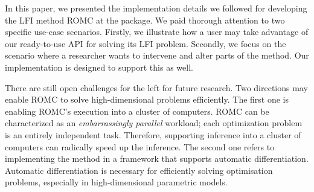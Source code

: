 In this paper, we presented the implementation details we followed for
developing the LFI method ROMC at the  package. We paid
thorough attention to two specific use-case scenarios. Firstly, we
illustrate how a user may take advantage of our ready-to-use API for
solving its LFI problem. Secondly, we focus on the scenario where a
researcher wants to intervene and alter parts of the method. Our
implementation is designed to support this as well.

There are still open challenges for the left for future research. Two
directions may enable ROMC to solve high-dimensional problems
efficiently. The first one is enabling ROMC's execution into a cluster
of computers. ROMC can be characterized as an \textit{embarrassingly
  parallel} workload; each optimization problem is an entirely
independent task. Therefore, supporting inference into a cluster of
computers can radically speed up the inference. The second one refers
to implementing the method in a framework that supports automatic
differentiation. Automatic differentiation is necessary for
efficiently solving optimisation problems, especially in
high-dimensional parametric models.
